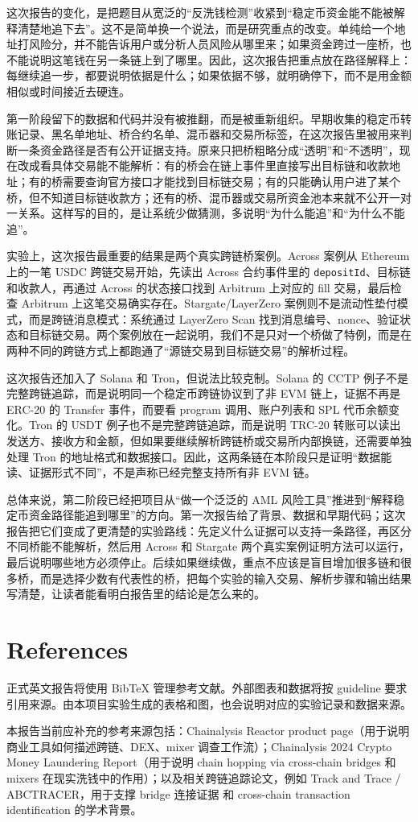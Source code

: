 \documentclass[12pt,a4paper]{ctexart}
\begin{document}
这次报告的变化，是把题目从宽泛的“反洗钱检测”收紧到“稳定币资金能不能被解释清楚地追下去”。这不是简单换一个说法，而是研究重点的改变。单纯给一个地址打风险分，并不能告诉用户或分析人员风险从哪里来；如果资金跨过一座桥，也不能说明这笔钱在另一条链上到了哪里。因此，这次报告把重点放在路径解释上：每继续追一步，都要说明依据是什么；如果依据不够，就明确停下，而不是用金额相似或时间接近去硬连。

第一阶段留下的数据和代码并没有被推翻，而是被重新组织。早期收集的稳定币转账记录、黑名单地址、桥合约名单、混币器和交易所标签，在这次报告里被用来判断一条资金路径是否有公开证据支持。原来只把桥粗略分成“透明”和“不透明”，现在改成看具体交易能不能解析：有的桥会在链上事件里直接写出目标链和收款地址；有的桥需要查询官方接口才能找到目标链交易；有的只能确认用户进了某个桥，但不知道目标链收款方；还有的桥、混币器或交易所资金池本来就不公开一对一关系。这样写的目的，是让系统少做猜测，多说明“为什么能追”和“为什么不能追”。

实验上，这次报告最重要的结果是两个真实跨链桥案例。Across 案例从 Ethereum 上的一笔 USDC 跨链交易开始，先读出 Across 合约事件里的 \texttt{depositId}、目标链和收款人，再通过 Across 的状态接口找到 Arbitrum 上对应的 fill 交易，最后检查 Arbitrum 上这笔交易确实存在。Stargate/LayerZero 案例则不是流动性垫付模式，而是跨链消息模式：系统通过 LayerZero Scan 找到消息编号、nonce、验证状态和目标链交易。两个案例放在一起说明，我们不是只对一个桥做了特例，而是在两种不同的跨链方式上都跑通了“源链交易到目标链交易”的解析过程。

这次报告还加入了 Solana 和 Tron，但说法比较克制。Solana 的 CCTP 例子不是完整跨链追踪，而是说明同一个稳定币跨链协议到了非 EVM 链上，证据不再是 ERC-20 的 Transfer 事件，而要看 program 调用、账户列表和 SPL 代币余额变化。Tron 的 USDT 例子也不是完整跨链追踪，而是说明 TRC-20 转账可以读出发送方、接收方和金额，但如果要继续解析跨链桥或交易所内部换链，还需要单独处理 Tron 的地址格式和数据接口。因此，这两条链在本阶段只是证明“数据能读、证据形式不同”，不是声称已经完整支持所有非 EVM 链。

总体来说，第二阶段已经把项目从“做一个泛泛的 AML 风险工具”推进到“解释稳定币资金路径能追到哪里”的方向。第一次报告给了背景、数据和早期代码；这次报告把它们变成了更清楚的实验路线：先定义什么证据可以支持一条路径，再区分不同桥能不能解析，然后用 Across 和 Stargate 两个真实案例证明方法可以运行，最后说明哪些地方必须停止。后续如果继续做，重点不应该是盲目增加很多链和很多桥，而是选择少数有代表性的桥，把每个实验的输入交易、解析步骤和输出结果写清楚，让读者能看明白报告里的结论是怎么来的。

\hypertarget{references}{%
\section{References}\label{references}}

正式英文报告将使用 BibTeX 管理参考文献。外部图表和数据将按 guideline
要求引用来源。由本项目实验生成的表格和图，也会说明对应的实验记录和数据来源。

本报告当前应补充的参考来源包括：Chainalysis Reactor product
page（用于说明商业工具如何描述跨链、DEX、mixer 调查工作流）；Chainalysis
2024 Crypto Money Laundering Report（用于说明 chain hopping via
cross-chain bridges 和 mixers
在现实洗钱中的作用）；以及相关跨链追踪论文，例如 Track and Trace /
ABCTRACER，用于支撑 bridge 连接证据 和 cross-chain transaction
identification 的学术背景。
\end{document}
